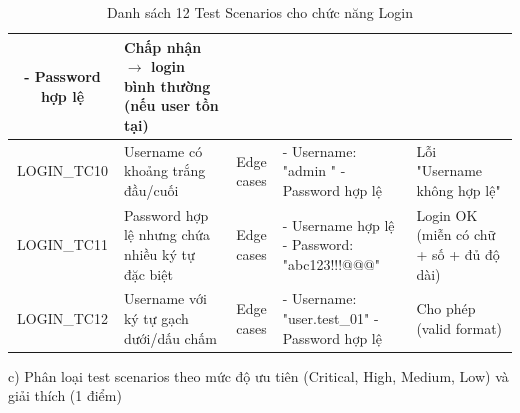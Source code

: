 \documentclass[a4paper,12pt]{article}
\begin{document}
\begin{table}[H]
\begin{tabularx}{\textwidth}{|c|>{\raggedright\arraybackslash}X|c|>{\raggedright\arraybackslash}X|>{\raggedright\arraybackslash}X|}
- Password hợp lệ  & Chấp nhận $\rightarrow$ login bình thường (nếu user tồn tại) \\
\hline
LOGIN\_TC10 & Username có khoảng trắng đầu/cuối & Edge cases &
- Username: "admin " \newline
- Password hợp lệ  & Lỗi "Username không hợp lệ" \\
\hline
LOGIN\_TC11 & Password hợp lệ nhưng chứa nhiều ký tự đặc biệt & Edge cases &
- Username hợp lệ \newline
- Password: "abc123!!!@@@"  & Login OK (miễn có chữ + số + đủ độ dài) \\
\hline
LOGIN\_TC12 & Username với ký tự gạch dưới/dấu chấm & Edge cases &
- Username: "user.test\_01" \newline
- Password hợp lệ  & Cho phép (valid format) \\
\hline
\end{tabularx}
\caption{Danh sách 12 Test Scenarios cho chức năng Login}
\end{table}
c) Phân loại test scenarios theo mức độ ưu tiên (Critical, High, Medium, Low) và giải thích (1 điểm)
\end{document}
